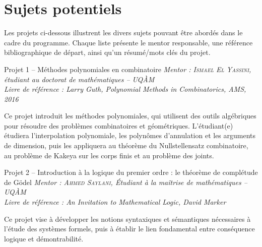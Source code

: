\section{Sujets potentiels}

Les projets ci-dessous illustrent les divers sujets pouvant être abordés dans le cadre du programme. Chaque liste présente le mentor responsable, une référence bibliographique de départ, ainsi qu'un résumé/mots clés du projet.

\begin{projectbox}{Projet 1 -- Méthodes polynomiales en combinatoire}
\textit{Mentor : \textsc{Ismael El Yassini}, étudiant au doctorat de mathématiques -- UQ\`AM}\\
\textit{Livre de référence : Larry Guth, \textit{Polynomial Methods in Combinatorics}, AMS, 2016}

\medskip
\noindent
Ce projet introduit les méthodes polynomiales, qui utilisent des outils algébriques pour résoudre des problèmes combinatoires et géométriques. L’étudiant(e) étudiera l’interpolation polynomiale, les polynômes d’annulation et les arguments de dimension, puis les appliquera au théorème du Nullstellensatz combinatoire, au problème de Kakeya sur les corps finis et au problème des joints. 
\end{projectbox}

\vspace{0.8em}

\begin{projectbox}{Projet 2 -- Introduction à la logique du premier ordre : le théorème de complétude de Gödel}
\textit{Mentor : \textsc{Ahmed Saylani}, \'Etudiant à la maîtrise de mathématiques -- UQ\`AM}\\
\textit{Livre de référence : An Invitation to Mathematical Logic, David Marker}

\medskip
\noindent Ce projet vise à développer les notions syntaxiques et sémantiques nécessaires à l'étude des systèmes formels, puis à établir le lien fondamental entre conséquence logique et démontrabilité.
\end{projectbox}

\vspace{0.8em}

